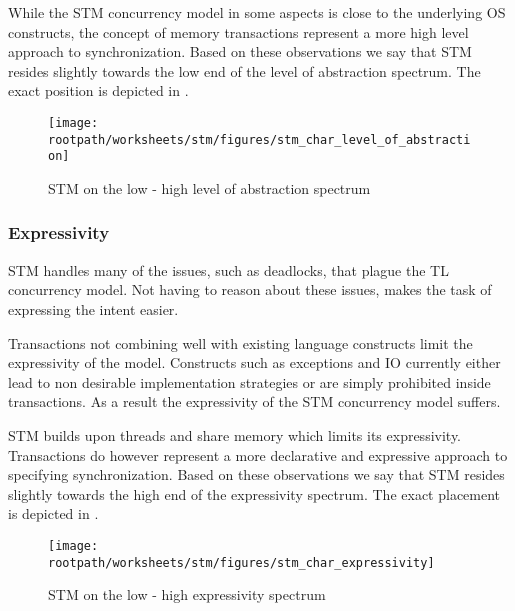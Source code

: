 While the \ac{STM} concurrency model in some aspects is close to the underlying \ac{OS} constructs, the concept of memory transactions represent a more high level approach to synchronization. Based on these observations we say that \ac{STM} resides slightly towards the low end of the level of abstraction spectrum. The exact position is depicted in .

\begin{figure}[htbp]
\centering
 \texttt{[image: \\rootpath/worksheets/stm/figures/stm\_char\_level\_of\_abstraction]} 
 \caption{\ac{STM} on the low - high level of abstraction spectrum}
\label{fig:char_stm_level_of_abstraction}
\end{figure}

\subsubsection{Expressivity}\label{sec:stm_expressivity}

\ac{STM} handles many of the issues, such as deadlocks, that plague the \ac{TL} concurrency model. Not having to reason about these issues, makes the task of expressing the intent easier. 

Transactions not combining well with existing language constructs limit the expressivity of the model. Constructs such as exceptions and \ac{IO} currently either lead to non desirable implementation strategies or are simply prohibited inside transactions. As a result the expressivity of the \ac{STM} concurrency model suffers.

\ac{STM} builds upon threads and share memory which limits its expressivity. Transactions do however represent a more declarative and expressive approach to specifying synchronization. Based on these observations we say that \ac{STM} resides slightly towards the high end of the expressivity spectrum. The exact placement is depicted in .

\begin{figure}[htbp]
\centering
 \texttt{[image: \\rootpath/worksheets/stm/figures/stm\_char\_expressivity]} 
 \caption{\ac{STM} on the low - high expressivity spectrum}
\label{fig:char_stm_expressivity}
\end{figure}

